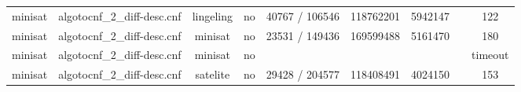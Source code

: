 \begin{appendices}
\begin{table}[p]
\begin{center}
\begin{tabular}{l|cccccccc}
  minisat                        & algotocnf\_2\_diff-desc.cnf    & lingeling  & no    & 40767 / 106546 & 118762201 & 5942147   &            & 122 \\ %
  minisat                        & algotocnf\_2\_diff-desc.cnf    & minisat    & no    & 23531 / 149436 & 169599488 & 5161470   &            & 180 \\ %
  minisat                        & algotocnf\_2\_diff-desc.cnf    & minisat    & no    &            &           &           &            & timeout \\ %
  minisat                        & algotocnf\_2\_diff-desc.cnf    & satelite   & no    & 29428 / 204577 & 118408491 & 4024150   &            & 153 \\ %
    \end{tabular}
  \end{center}
\end{table}

\newpage


\end{appendices}
